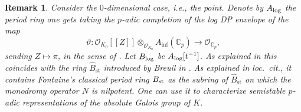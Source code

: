 \documentclass[asterisque,english]{smfart}
\newtheorem{remark}[theo]{Remark}
\begin{document}
\begin{remark}\label{rmk:Blog}
Consider the $0$-dimensional case, i.e., the point. Denote by $A_{\rm log}$  the period ring one gets  taking the $p$-adic completion of the log DP envelope of the map $$\vartheta \colon \mathcal{O}_{K_0}[\![Z]\!] \otimes_{\mathcal{O}_{K_0}} A_{\mathrm{inf}}(\mathbb{C}_p) \to \mathcal{O}_{\mathbb{C}_p},$$sending $Z\mapsto \pi$, in the sense of \cite[Lemma 2.16]{AI}. Let $B_{\rm log}$ be $A_{\rm log}[t^{-1}]$.  As explained in \cite[\S 2.1.1]{AI}  this coincides with the ring $\widehat{B}_{\mathrm{st}}$ introduced by Breuil in  \cite{Breuil}. As explained in loc.~cit., it contains Fontaine's classical period ring $B_{\rm st}$ as the subring of  $\widehat{B}_{\mathrm{st}}$ on which the monodromy operator $N$ is nilpotent. One can use it to characterize semistable $p$-adic representations of the absolute Galois group of $K$.

\end{remark}
\end{document}
